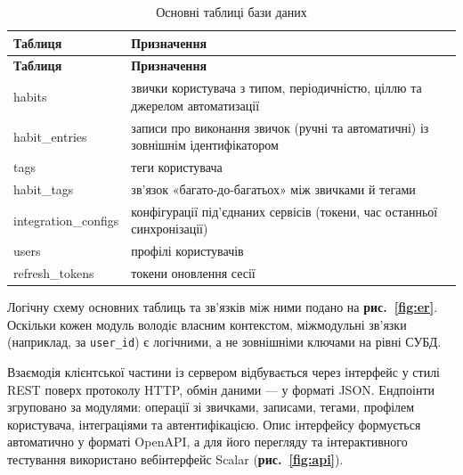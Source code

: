 \needspace{6.5cm}
\begin{spacing}{1.2}
    \footnotesize
    \noindent
    \begin{xltabular}{\textwidth}{| >{\raggedright\arraybackslash}X | >{\raggedright\arraybackslash}X |}
        \caption{Основні таблиці бази даних} \label{tab:db} \\
        \hline
        \textbf{Таблиця} & \textbf{Призначення} \\ \hline
        \endfirsthead

        \hline
        \textbf{Таблиця} & \textbf{Призначення} \\ \hline
        \endhead

        habits & звички користувача з типом, періодичністю, ціллю та джерелом автоматизації \\ \hline
        habit\_entries & записи про виконання звичок (ручні та автоматичні) із зовнішнім ідентифікатором \\ \hline
        tags & теги користувача \\ \hline
        habit\_tags & зв'язок «багато-до-багатьох» між звичками й тегами \\ \hline
        integration\_configs & конфігурації під'єднаних сервісів (токени, час останньої синхронізації) \\ \hline
        users & профілі користувачів \\ \hline
        refresh\_tokens & токени оновлення сесії \\ \hline
    \end{xltabular}
\end{spacing}

Логічну схему основних таблиць та зв'язків між ними подано на \textbf{рис.~\ref{fig:er}}. Оскільки кожен модуль володіє власним контекстом, міжмодульні зв'язки (наприклад, за \texttt{user\_id}) є логічними, а не зовнішніми ключами на рівні СУБД.



Взаємодія клієнтської частини із сервером відбувається через інтерфейс у стилі REST поверх протоколу HTTP, обмін даними — у форматі JSON. Ендпоінти згруповано за модулями: операції зі звичками, записами, тегами, профілем користувача, інтеграціями та автентифікацією. Опис інтерфейсу формується автоматично у форматі OpenAPI, а для його перегляду та інтерактивного тестування використано вебінтерфейс Scalar (\textbf{рис.~\ref{fig:api}}).

